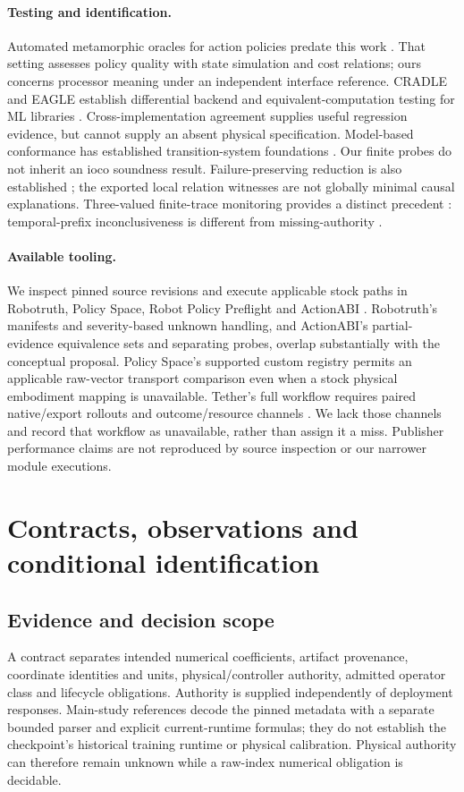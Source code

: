\paragraph{Testing and identification.}
Automated metamorphic oracles for action policies predate this work \citep{eisenhut2023}. That setting assesses policy quality with state simulation and cost relations; ours concerns processor meaning under an independent interface reference. CRADLE and EAGLE establish differential backend and equivalent-computation testing for ML libraries \citep{pham2019cradle,wang2022eagle}. Cross-implementation agreement supplies useful regression evidence, but cannot supply an absent physical specification. Model-based conformance has established transition-system foundations \citep{tretmans2008}. Our finite probes do not inherit an ioco soundness result. Failure-preserving reduction is also established \citep{zeller2002simplifying}; the exported local relation witnesses are not globally minimal causal explanations. Three-valued finite-trace monitoring provides a distinct precedent \citep{bauer2011runtime}: temporal-prefix inconclusiveness is different from missing-authority \UNKNOWN{}.

\paragraph{Available tooling.}
We inspect pinned source revisions and execute applicable stock paths in Robotruth, Policy Space, Robot Policy Preflight and ActionABI \citep{robotruth2026,policyspace2026,preflight2026,actionabi2026}. Robotruth's manifests and severity-based unknown handling, and ActionABI's partial-evidence equivalence sets and separating probes, overlap substantially with the conceptual proposal. Policy Space's supported custom registry permits an applicable raw-vector transport comparison even when a stock physical embodiment mapping is unavailable. Tether's full workflow requires paired native/export rollouts and outcome/resource channels \citep{tether2026}. We lack those channels and record that workflow as unavailable, rather than assign it a miss. Publisher performance claims are not reproduced by source inspection or our narrower module executions.

\section{Contracts, observations and conditional identification}
\subsection{Evidence and decision scope}
A contract separates intended numerical coefficients, artifact provenance, coordinate identities and units, physical/controller authority, admitted operator class and lifecycle obligations. Authority is supplied independently of deployment responses. Main-study references decode the pinned metadata with a separate bounded parser and explicit current-runtime formulas; they do not establish the checkpoint's historical training runtime or physical calibration. Physical authority can therefore remain unknown while a raw-index numerical obligation is decidable.


